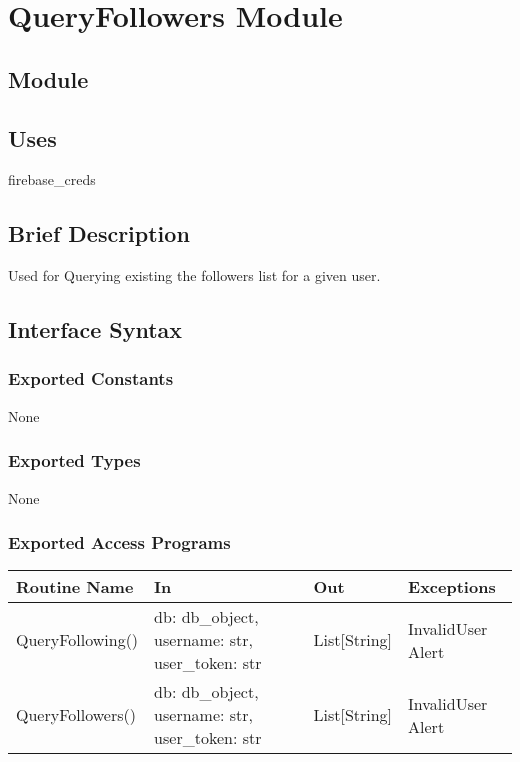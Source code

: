 \documentclass[12pt, titlepage]{article}
\begin{document}
\newpage
\section* {QueryFollowers Module}

\subsection*{Module}

\subsection* {Uses}
firebase\_creds

\subsection* {Brief Description}
Used for Querying existing the followers list for a given user.


\subsection* {Interface Syntax}
\subsubsection* {Exported Constants}
None

\subsubsection* {Exported Types}
None

\subsubsection* {Exported Access Programs}
\begin{table}[!htb]
    \centering
    \begin{tabular}{|p{3cm}|p{3cm}|p{3cm}|p{4.5cm}|}
        \hline
        \textbf{Routine Name} & \textbf{In} & \textbf{Out} & \textbf{Exceptions} \\
        \hline
         QueryFollowing() & db: db\_object, username: str, user\_token: str  & List[String] & InvalidUser Alert\\
        \hline
         QueryFollowers() & db: db\_object, username: str, user\_token: str  & List[String] & InvalidUser Alert\\
        \hline
    \end{tabular}
\end{table}
\end{document}
